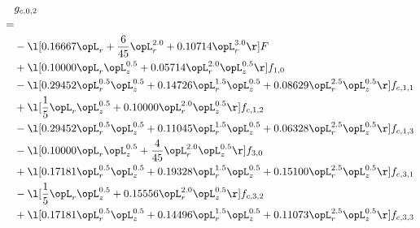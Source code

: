 \begin{alignat}{2} 
\label{eq:g_02_0} 
& g_{c,0,2} \nonumber \\ 
 = \\ 
& - \l[  0.16667 \opL_r + \frac{6}{45} \opL_r^{2.0} +  0.10714 \opL_r^{3.0}  \r] F \nonumber \\ 
& + \l[  0.10000 \opL_r \opL_z^{0.5} +  0.05714 \opL_r^{2.0} \opL_z^{0.5}  \r] f_{1,0} \nonumber \\ 
& - \l[  0.29452 \opL_r^{0.5} \opL_z^{0.5} +  0.14726 \opL_r^{1.5} \opL_z^{0.5} +  0.08629 \opL_r^{2.5} \opL_z^{0.5}  \r] f_{c,1,1} \nonumber \\ 
& + \l[ \frac{1}{5} \opL_r \opL_z^{0.5} +  0.10000 \opL_r^{2.0} \opL_z^{0.5}  \r] f_{c,1,2} \nonumber \\ 
& - \l[  0.29452 \opL_r^{0.5} \opL_z^{0.5} +  0.11045 \opL_r^{1.5} \opL_z^{0.5} +  0.06328 \opL_r^{2.5} \opL_z^{0.5}  \r] f_{c,1,3} \nonumber \\ 
& - \l[  0.10000 \opL_r \opL_z^{0.5} + \frac{4}{45} \opL_r^{2.0} \opL_z^{0.5}  \r] f_{3,0} \nonumber \\ 
& + \l[  0.17181 \opL_r^{0.5} \opL_z^{0.5} +  0.19328 \opL_r^{1.5} \opL_z^{0.5} +  0.15100 \opL_r^{2.5} \opL_z^{0.5}  \r] f_{c,3,1} \nonumber \\ 
& - \l[ \frac{1}{5} \opL_r \opL_z^{0.5} +  0.15556 \opL_r^{2.0} \opL_z^{0.5}  \r] f_{c,3,2} \nonumber \\ 
& + \l[  0.17181 \opL_r^{0.5} \opL_z^{0.5} +  0.14496 \opL_r^{1.5} \opL_z^{0.5} +  0.11073 \opL_r^{2.5} \opL_z^{0.5}  \r] f_{c,3,3} \nonumber \\ 
\end{alignat} 


